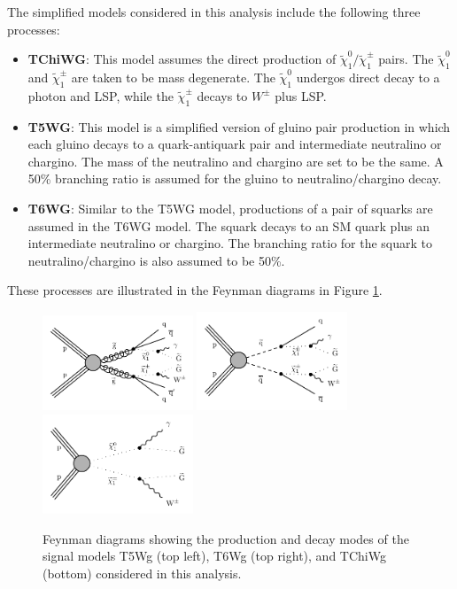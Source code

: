 \documentclass[thesis.tex]{subfiles}
\begin{document}
The simplified models considered in this analysis include the following three processes: 
	\begin{itemize}
		\item \textbf{TChiWG}: This model assumes the direct production of $\tilde{\chi}_1^0/\tilde{\chi}_1^\pm$ pairs. The $\tilde{\chi}_1^0$ and $\tilde{\chi}_1^\pm$ are taken to be mass degenerate. The $\tilde{\chi}_1^0$ undergos direct decay to a photon and LSP, while the $\tilde{\chi}_1^\pm$ decays to $W^\pm$ plus LSP. 
		\item  \textbf{T5WG}: This model is a simplified version of gluino pair production in which each gluino decays to a quark-antiquark pair and intermediate neutralino or chargino. The mass of the neutralino and chargino are set to be the same. A 50\% branching ratio is assumed for the gluino to neutralino/chargino decay. 
		\item \textbf{T6WG}: Similar to the T5WG model, productions of a pair of squarks are assumed in the T6WG model. The squark decays to an SM quark plus an intermediate neutralino or chargino. The branching ratio for the squark to neutralino/chargino is also assumed to be 50\%. 
	\end{itemize}
These processes are illustrated in the Feynman diagrams in Figure \ref{fig:feyngmsb}.

	\begin{figure}[!h]
	\centering
		\includegraphics[width=0.4\textwidth]{plot/gitT5qqqqWG.pdf}
		\includegraphics[width=0.4\textwidth]{plot/gitT6qqWG.pdf}  \\
		\includegraphics[width=0.4\textwidth]{plot/gitTChiGW.pdf} 
	\caption{Feynman diagrams showing the production and decay modes of the signal models T5Wg (top left), T6Wg (top right), and TChiWg (bottom) considered in this analysis.}
	\label{fig:feyngmsb}
	\end{figure}
\end{document}
